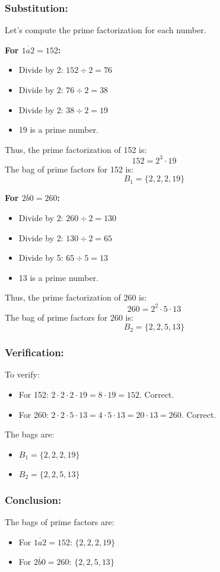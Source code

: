 \documentclass[12pt, a4paper, twoside]{report} %
\begin{document}
\subsubsection*{Substitution:}
Let’s compute the prime factorization for each number.

\textbf{For \(\overline{1a2} = 152\):}
\begin{itemize}
  \item Divide by 2: \( 152 \div 2 = 76 \)
  \item Divide by 2: \( 76 \div 2 = 38 \)
  \item Divide by 2: \( 38 \div 2 = 19 \)
  \item 19 is a prime number.
\end{itemize}
Thus, the prime factorization of 152 is:
\[
152 = 2^3 \cdot 19
\]
The bag of prime factors for 152 is:
\[
B_1 = \{2, 2, 2, 19\}
\]

\textbf{For \(\overline{2b0} = 260\):}
\begin{itemize}
  \item Divide by 2: \( 260 \div 2 = 130 \)
  \item Divide by 2: \( 130 \div 2 = 65 \)
  \item Divide by 5: \( 65 \div 5 = 13 \)
  \item 13 is a prime number.
\end{itemize}
Thus, the prime factorization of 260 is:
\[
260 = 2^2 \cdot 5 \cdot 13
\]
The bag of prime factors for 260 is:
\[
B_2 = \{2, 2, 5, 13\}
\]

\subsubsection*{Verification:}
To verify:
\begin{itemize}
  \item For 152: \( 2 \cdot 2 \cdot 2 \cdot 19 = 8 \cdot 19 = 152 \). Correct.
  \item For 260: \( 2 \cdot 2 \cdot 5 \cdot 13 = 4 \cdot 5 \cdot 13 = 20 \cdot 13 = 260 \). Correct.
\end{itemize}
The bags are:
\begin{itemize}
  \item \( B_1 = \{2, 2, 2, 19\} \)
  \item \( B_2 = \{2, 2, 5, 13\} \)
\end{itemize}

\subsubsection*{Conclusion:}
The bags of prime factors are:
\begin{itemize}
  \item For \(\overline{1a2} = 152\): \( \{2, 2, 2, 19\} \)
  \item For \(\overline{2b0} = 260\): \( \{2, 2, 5, 13\} \)
\end{itemize}
\end{document}
